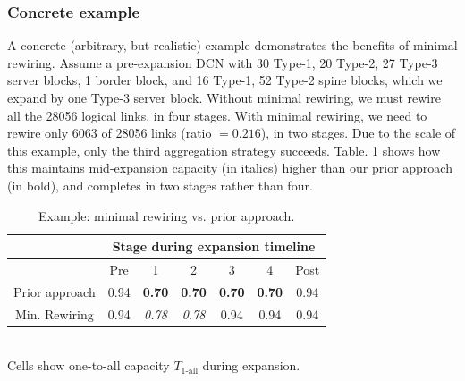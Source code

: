 \documentclass[letterpaper,twocolumn,10pt]{article}
\begin{document}
\subsubsection{Concrete example}\label{concrete_example}
A concrete (arbitrary, but realistic) example demonstrates the benefits of minimal rewiring.  Assume a pre-expansion DCN with 30 Type-1, 20 Type-2, 27 Type-3 server blocks, 1 border block, and 16 Type-1, 52 Type-2 spine blocks, which we expand by one Type-3 server block. Without minimal rewiring, we must rewire all the 28056 logical links, in four stages. With minimal rewiring, we need to rewire only 6063 of 28056 links (ratio $=0.216$), in two stages. Due to the scale of this example, only the third aggregation strategy succeeds. Table. \ref{casestudy} shows how this maintains mid-expansion capacity (in italics) higher than our prior approach (in bold), and completes in two stages rather than four.

\begin{table}[ht]
\small
\centering
\caption{Example: minimal rewiring vs. prior approach.}\label{casestudy}
\begin{tabular}{|c|c|c|c|c|c|c|}
\hline
 & \multicolumn{6}{c|}{Stage during expansion timeline} \\
\hline
 & Pre & 1 & 2 & 3 & 4 & Post  \\
\hline
\hline
Prior approach & 0.94 & \textbf{0.70} & \textbf{0.70} & \textbf{0.70} & \textbf{0.70} & 0.94  \\
\hline
Min. Rewiring & 0.94 & \textit{0.78} & \textit{0.78} & 0.94 & 0.94 & 0.94  \\
\hline
\end{tabular}
\\Cells show one-to-all capacity $T_{\text{1-all}}$ during expansion.
\end{table}

\end{document}
